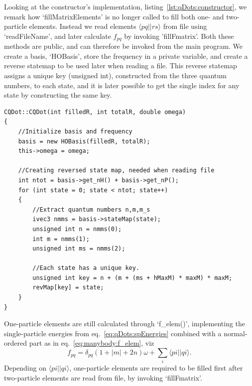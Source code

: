 Looking at the constructor's implementation, listing~\ref{lst:qDots:constructor}, we remark how `fillMatrixElements' is no longer called to fill both one- and two-particle elements. 
Instead we read elements $\langle pq||rs \rangle$ from file using `readFileName', and later calculate $f_{pq}$ by invoking 'fillFmatrix'. Both these methods are public, and can therefore be invoked from the main program.
We create a basis, `HOBasis', store the frequency in a private variable, and create a reverse statemap to be used later when reading a file.
This reverse statemap assigns a unique key (unsigned int), constructed from the three quantum numbers, to each state, and it is later possible to get the single index for any state by constructing the same key.
\begin{lstlisting}[float,label={lst:qDots:constructor},caption={Constructor for CQDot.}]
CQDot::CQDot(int filledR, int totalR, double omega)
{
    //Initialize basis and frequency
    basis = new HOBasis(filledR, totalR);
    this->omega = omega;

    //Creating reversed state map, needed when reading file
    int ntot = basis->get_nH() + basis->get_nP();
    for (int state = 0; state < ntot; state++)
    {
    	//Extract quantum numbers n,m,m_s
        ivec3 nmms = basis->stateMap(state);
        unsigned int n = nmms(0);
        int m = nmms(1);
        unsigned int ms = nmms(2);
        
        //Each state has a unique key.
        unsigned int key = n + (m + (ms + hMaxM) * maxM) * maxM;
        revMap[key] = state;
    }
}
\end{lstlisting}

One-particle elements are still calculated through `f\_elem()', implementing the single-particle energies from eq.~\eqref{eq:qDots:spEnergies} combined with a normal-ordered part as in eq.~\eqref{eq:manybody:f_elem}, viz
\begin{equation}
f_{pq} = \delta_{pq} \left(1 + |m| + 2n \right) \omega   + \sum_{i} \langle pi||qi \rangle .
\end{equation}
Depending on $\langle pi||qi \rangle$, one-particle elements are required to be filled first after two-particle elements are read from file, by invoking `fillFmatrix'.

